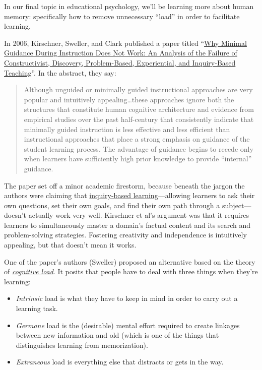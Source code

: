 
In our final topic in educational psychology, we'll be learning more
about human memory: specifically how to remove unnecessary ``load'' in
order to facilitate learning.


In 2006, Kirschner, Sweller, and Clark published a paper titled
``\href{http://www.cogtech.usc.edu/publications/kirschner\_Sweller\_Clark.pdf}{Why
Minimal Guidance During Instruction Does Not Work: An Analysis of the
Failure of Constructivist, Discovery, Problem-Based, Experiential, and
Inquiry-Based Teaching}''. In the abstract, they say:

\begin{quote}
Although unguided or minimally guided instructional approaches are very
popular and intuitively appealing\ldots{}these approaches ignore both
the structures that constitute human cognitive architecture and evidence
from empirical studies over the past half-century that consistently
indicate that minimally guided instruction is less effective and less
efficient than instructional approaches that place a strong emphasis on
guidance of the student learning process. The advantage of guidance
begins to recede only when learners have sufficiently high prior
knowledge to provide ``internal'' guidance.
\end{quote}

The paper set off a minor academic firestorm, because beneath the jargon
the authors were claiming that
\href{https://en.wikipedia.org/wiki/Inquiry-based\_learning}{inquiry-based
learning}---allowing learners to ask their own questions, set their own
goals, and find their own path through a subject---doesn't actually work
very well. Kirschner et al's argument was that it requires learners to
simultaneously master a domain's factual content and its search and
problem-solving strategies. Fostering creativity and independence is
intuitively appealing, but that doesn't mean it works.

One of the paper's authors (Sweller) proposed an alternative based on
the theory of
\emph{\href{https://en.wikipedia.org/wiki/Cognitive\_load}{cognitive
load}}. It posits that people have to deal with three things when
they're learning:

\begin{itemize}
\item
  \emph{Intrinsic} load is what they have to keep in mind in order to
  carry out a learning task.
\item
  \emph{Germane} load is the (desirable) mental effort required to
  create linkages between new information and old (which is one of the
  things that distinguishes learning from memorization).
\item
  \emph{Extraneous} load is everything else that distracts or gets in
  the way.
\end{itemize}

